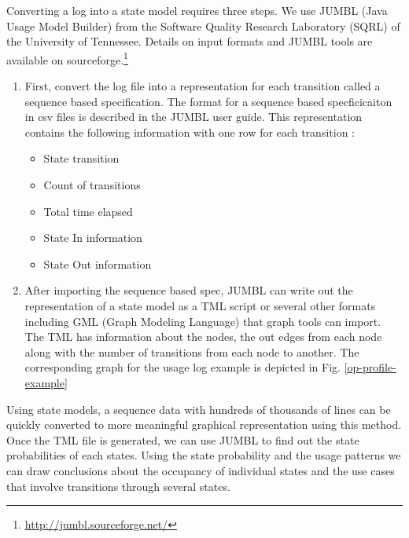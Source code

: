 Converting a log into a state model requires three steps.  We use JUMBL (Java Usage Model Builder) from the Software Quality Research Laboratory (SQRL) of the University of Tennessee.    Details on input formats and JUMBL tools are available on sourceforge.\footnote{\url{http://jumbl.sourceforge.net/}}
\begin{enumerate}
\item
First, convert the log file into a representation for each transition called a sequence based specification. The format for a sequence based specficicaiton in csv files is described in the JUMBL user guide. This representation contains the following information with one row for each transition :
\begin{itemize}
\item State transition
\item Count of transitions
\item Total time elapsed
\item State In information
\item State Out information
\end{itemize}

\item
After importing the sequence based spec, JUMBL can write out the representation of a state model as a TML script or several other formats including GML (Graph Modeling Language) that graph tools can import.  The TML  has information about the nodes, the out edges from each node along with the number of transitions from each node to another. The corresponding graph for the usage log example is depicted in Fig. \ref{op-profile-example}
\end{enumerate}


Using state models, a sequence data with hundreds of thousands of lines can be quickly converted to more meaningful graphical representation using this method. Once the TML file is generated, we can use JUMBL to find out the state probabilities of each states. Using the state probability and the usage patterns we can draw conclusions about the occupancy of individual states and the use cases that involve transitions through several states.



%
%
%
%
%
%
%
%
%




